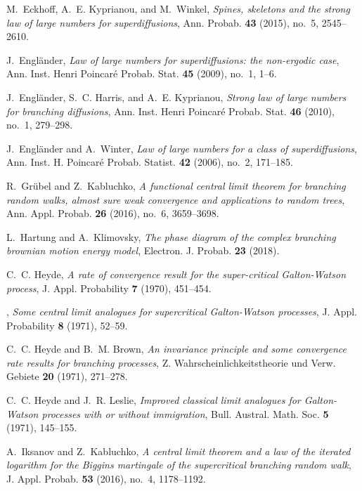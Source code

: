 \documentclass[12pt,a4paper]{amsart}
\theoremstyle{plain}
\theoremstyle{definition}
\numberwithin{equation}{section}
\begin{document}
\begin{thebibliography}{10}
M.~Eckhoff, A.~E. Kyprianou, and M.~Winkel, \emph{Spines, skeletons and the
  strong law of large numbers for superdiffusions}, Ann. Probab. \textbf{43}
  (2015), no.~5, 2545--2610.

J.~Engl\"{a}nder, \emph{Law of large numbers for superdiffusions: the
  non-ergodic case}, Ann. Inst. Henri Poincar\'{e} Probab. Stat. \textbf{45}
  (2009), no.~1, 1--6.

J.~Engl\"{a}nder, S.~C. Harris, and A.~E. Kyprianou, \emph{Strong law of large
  numbers for branching diffusions}, Ann. Inst. Henri Poincar\'{e} Probab.
  Stat. \textbf{46} (2010), no.~1, 279--298.

J.~Engl\"{a}nder and A.~Winter, \emph{Law of large numbers for a class of
  superdiffusions}, Ann. Inst. H. Poincar\'{e} Probab. Statist. \textbf{42}
  (2006), no.~2, 171--185.

R.~Gr\"{u}bel and Z.~Kabluchko, \emph{A functional central limit theorem for
  branching random walks, almost sure weak convergence and applications to
  random trees}, Ann. Appl. Probab. \textbf{26} (2016), no.~6, 3659--3698.

L.~Hartung and A.~Klimovsky, \emph{The phase diagram of the complex branching
  brownian motion energy model}, Electron. J. Probab. \textbf{23} (2018).

C.~C. Heyde, \emph{A rate of convergence result for the super-critical
  {G}alton-{W}atson process}, J. Appl. Probability \textbf{7} (1970), 451--454.

\bysame, \emph{Some central limit analogues for supercritical {G}alton-{W}atson
  processes}, J. Appl. Probability \textbf{8} (1971), 52--59.

C.~C. Heyde and B.~M. Brown, \emph{An invariance principle and some convergence
  rate results for branching processes}, Z. Wahrscheinlichkeitstheorie und
  Verw. Gebiete \textbf{20} (1971), 271--278.

C.~C. Heyde and J.~R. Leslie, \emph{Improved classical limit analogues for
  {G}alton-{W}atson processes with or without immigration}, Bull. Austral.
  Math. Soc. \textbf{5} (1971), 145--155.

A.~Iksanov and Z.~Kabluchko, \emph{A central limit theorem and a law of the
  iterated logarithm for the {B}iggins martingale of the supercritical
  branching random walk}, J. Appl. Probab. \textbf{53} (2016), no.~4,
  1178--1192.


\end{thebibliography}
\end{document}
